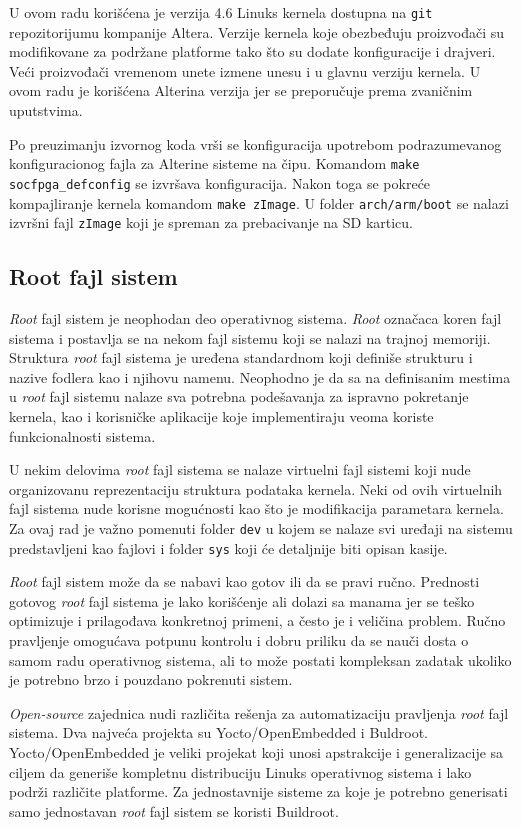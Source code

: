 U ovom radu korišćena je verzija 4.6 Linuks kernela dostupna na \texttt{git} repozitorijumu kompanije Altera. Verzije kernela koje obezbeđuju proizvođači su modifikovane za podržane platforme tako što su dodate konfiguracije i drajveri. Veći proizvođači vremenom unete izmene unesu i u glavnu verziju kernela. U ovom radu je korišćena Alterina verzija jer se preporučuje prema zvaničnim uputstvima.

Po preuzimanju izvornog koda vrši se konfiguracija upotrebom podrazumevanog konfiguracionog fajla za Alterine sisteme na čipu. Komandom \texttt{make socfpga\_defconfig} se izvršava konfiguracija. Nakon toga se pokreće kompajliranje kernela komandom \texttt{make zImage}. U folder \texttt{arch/arm/boot} se nalazi izvršni fajl \texttt{zImage} koji je spreman za prebacivanje na SD karticu.
\subsection{Root fajl sistem}
\textit{Root} fajl sistem je neophodan deo operativnog sistema. \textit{Root} označaca koren fajl sistema i postavlja se na nekom fajl sistemu koji se nalazi na trajnoj memoriji. Struktura \textit{root} fajl sistema je uređena standardnom \cite{fhs} koji definiše strukturu i nazive fodlera kao i njihovu namenu. Neophodno je da sa na definisanim mestima u \textit{root} fajl sistemu nalaze sva potrebna podešavanja za ispravno pokretanje kernela, kao i korisničke aplikacije koje implementiraju veoma koriste funkcionalnosti sistema.

U nekim delovima \textit{root} fajl sistema se nalaze virtuelni fajl sistemi koji nude organizovanu reprezentaciju struktura podataka kernela. Neki od ovih virtuelnih fajl sistema nude korisne mogućnosti kao što je modifikacija parametara kernela. Za ovaj rad je važno pomenuti folder \texttt{dev} u kojem se nalaze svi uređaji na sistemu predstavljeni kao fajlovi i folder \texttt{sys} koji će detaljnije biti opisan kasije.

\textit{Root} fajl sistem može da se nabavi kao gotov ili da se pravi ručno. Prednosti gotovog \textit{root} fajl sistema je lako korišćenje ali dolazi sa manama jer se teško optimizuje i prilagođava konkretnoj primeni, a često je i veličina problem. Ručno pravljenje omogućava potpunu kontrolu i dobru priliku da se nauči dosta o samom radu operativnog sistema, ali to može postati kompleksan zadatak ukoliko je potrebno brzo i pouzdano pokrenuti sistem.

\textit{Open-source} zajednica nudi različita rešenja za automatizaciju pravljenja \textit{root} fajl sistema. Dva najveća projekta su Yocto/OpenEmbedded i Buldroot. Yocto/OpenEmbedded je veliki projekat koji unosi apstrakcije i generalizacije sa ciljem da generiše kompletnu distribuciju Linuks operativnog sistema i lako podrži različite platforme. Za jednostavnije sisteme za koje je potrebno generisati samo jednostavan \textit{root} fajl sistem se koristi Buildroot.

